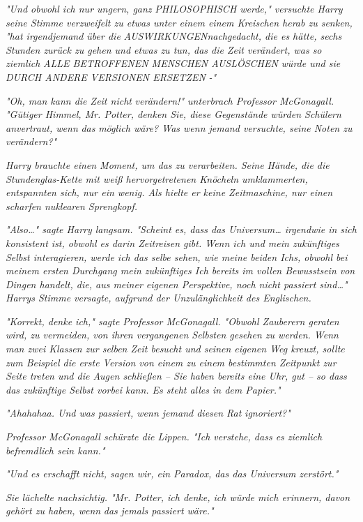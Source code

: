 {\emph{"Und obwohl ich nur ungern, ganz} \emph{\emph{PHILOSOPHISCH werde,}" versuchte Harry seine Stimme verzweifelt zu etwas unter einem einem Kreischen herab zu senken, "hat irgendjemand über die} \emph{\emph{AUSWIRKUNGEN}nachgedacht, die es hätte, sechs Stunden zurück zu gehen und etwas zu tun, das die Zeit verändert, was so ziemlich} \emph{\emph{ALLE BETROFFENEN MENSCHEN AUSLÖSCHEN}} \emph{würde und sie} \emph{\emph{DURCH ANDERE VERSIONEN ERSETZEN}} \emph{-"}

\emph{"Oh, man kann die Zeit nicht} \emph{\emph{verändern!}" unterbrach Professor McGonagall. "Gütiger Himmel, Mr. Potter, denken Sie, diese Gegenstände würden Schülern anvertraut, wenn} \emph{\emph{das}} \emph{möglich wäre? Was wenn jemand versuchte, seine Noten zu verändern?"}

\emph{Harry brauchte einen Moment, um das zu verarbeiten. Seine Hände, die die Stundenglas-Kette mit weiß hervorgetretenen Knöcheln umklammerten, entspannten sich, nur ein wenig. Als hielte er keine Zeitmaschine, nur einen scharfen nuklearen Sprengkopf.}

\emph{"Also…" sagte Harry langsam. "Scheint es, dass das Universum… irgendwie in sich konsistent ist, obwohl es darin Zeitreisen gibt. Wenn ich und mein zukünftiges Selbst interagieren, werde ich das selbe sehen, wie meine beiden Ichs, obwohl bei meinem ersten Durchgang mein zukünftiges Ich bereits im vollen Bewusstsein von Dingen handelt, die, aus meiner eigenen Perspektive, noch nicht passiert sind…" Harrys Stimme versagte, aufgrund der Unzulänglichkeit des Englischen.}

\emph{"Korrekt, denke ich," sagte Professor McGonagall. "Obwohl Zauberern geraten wird, zu vermeiden, von ihren vergangenen Selbsten gesehen zu werden. Wenn man zwei Klassen zur selben Zeit besucht und seinen eigenen Weg kreuzt, sollte zum Beispiel die erste Version von einem zu einem bestimmten Zeitpunkt zur Seite treten und die Augen schließen -- Sie haben bereits eine Uhr, gut -- so dass das zukünftige Selbst vorbei kann. Es steht alles in dem Papier."}

\emph{"Ahahahaa. Und was passiert, wenn jemand diesen Rat} \emph{\emph{ignoriert?}"}

\emph{Professor McGonagall schürzte die Lippen. "Ich verstehe, dass es ziemlich befremdlich sein kann."}

\emph{"Und es erschafft nicht, sagen wir, ein Paradox, das das Universum zerstört."}

\emph{Sie lächelte nachsichtig. "Mr. Potter, ich denke, ich würde mich erinnern, davon gehört zu haben, wenn} \emph{\emph{das}} \emph{jemals passiert wäre."}

}
